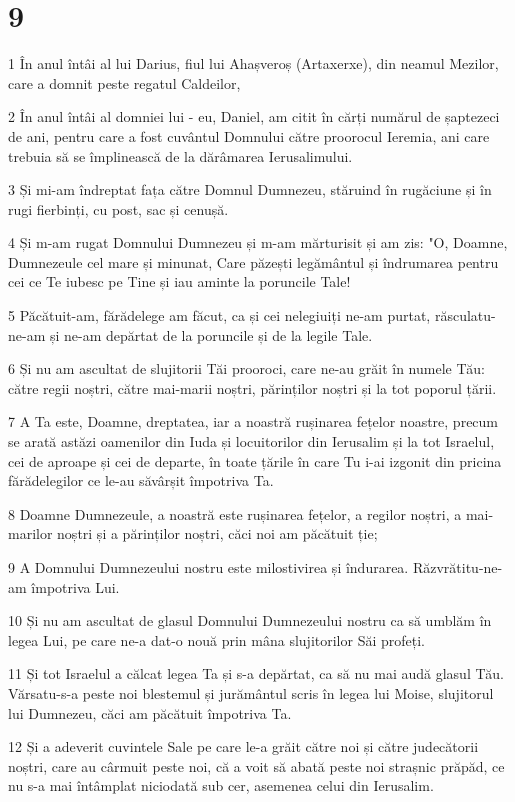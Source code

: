 \chapter{9}

\par 1 În anul întâi al lui Darius, fiul lui Ahașveroș (Artaxerxe), din neamul Mezilor, care a domnit peste regatul Caldeilor,
\par 2 În anul întâi al domniei lui - eu, Daniel, am citit în cărți numărul de șaptezeci de ani, pentru care a fost cuvântul Domnului către proorocul Ieremia, ani care trebuia să se împlinească de la dărâmarea Ierusalimului.
\par 3 Și mi-am îndreptat fața către Domnul Dumnezeu, stăruind în rugăciune și în rugi fierbinți, cu post, sac și cenușă.
\par 4 Și m-am rugat Domnului Dumnezeu și m-am mărturisit și am zis: "O, Doamne, Dumnezeule cel mare și minunat, Care păzești legământul și îndrumarea pentru cei ce Te iubesc pe Tine și iau aminte la poruncile Tale!
\par 5 Păcătuit-am, fărădelege am făcut, ca și cei nelegiuiți ne-am purtat, răsculatu-ne-am și ne-am depărtat de la poruncile și de la legile Tale.
\par 6 Și nu am ascultat de slujitorii Tăi prooroci, care ne-au grăit în numele Tău: către regii noștri, către mai-marii noștri, părinților noștri și la tot poporul țării.
\par 7 A Ta este, Doamne, dreptatea, iar a noastră rușinarea fețelor noastre, precum se arată astăzi oamenilor din Iuda și locuitorilor din Ierusalim și la tot Israelul, cei de aproape și cei de departe, în toate țările în care Tu i-ai izgonit din pricina fărădelegilor ce le-au săvârșit împotriva Ta.
\par 8 Doamne Dumnezeule, a noastră este rușinarea fețelor, a regilor noștri, a mai-marilor noștri și a părinților noștri, căci noi am păcătuit ție;
\par 9 A Domnului Dumnezeului nostru este milostivirea și îndurarea. Răzvrătitu-ne-am împotriva Lui.
\par 10 Și nu am ascultat de glasul Domnului Dumnezeului nostru ca să umblăm în legea Lui, pe care ne-a dat-o nouă prin mâna slujitorilor Săi profeți.
\par 11 Și tot Israelul a călcat legea Ta și s-a depărtat, ca să nu mai audă glasul Tău. Vărsatu-s-a peste noi blestemul și jurământul scris în legea lui Moise, slujitorul lui Dumnezeu, căci am păcătuit împotriva Ta.
\par 12 Și a adeverit cuvintele Sale pe care le-a grăit către noi și către judecătorii noștri, care au cârmuit peste noi, că a voit să abată peste noi strașnic prăpăd, ce nu s-a mai întâmplat niciodată sub cer, asemenea celui din Ierusalim.
